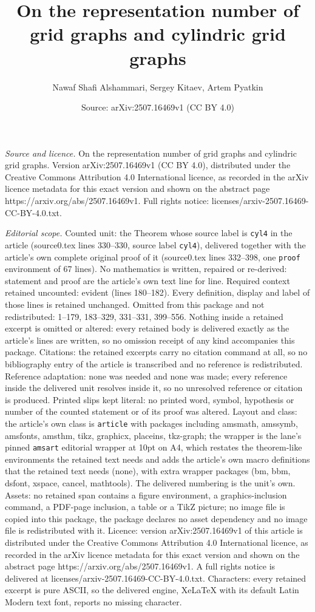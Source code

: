 \documentclass[10pt,a4paper]{amsart}
\title[On the representation number of grid graphs and cylindric gr]{On the representation number of grid graphs and cylindric grid graphs}
\author{Nawaf Shafi Alshammari, Sergey Kitaev, Artem Pyatkin}
\date{Source: arXiv:2507.16469v1 (CC BY 4.0)}
\begin{document}
\maketitle

\noindent\emph{Source and licence.} On the representation number of grid graphs and cylindric grid graphs. Version arXiv:2507.16469v1 (CC BY 4.0), distributed under the Creative Commons Attribution 4.0 International licence, as recorded in the arXiv licence metadata for this exact version and shown on the abstract page https://arxiv.org/abs/2507.16469v1. Full rights notice: licenses/arxiv-2507.16469-CC-BY-4.0.txt.\par\smallskip

\noindent\textit{Editorial scope.} Counted unit: the Theorem whose source label is \texttt{cyl4} in the article (source0.tex lines 330--330, source label \texttt{cyl4}), delivered together with the article's own complete original proof of it (source0.tex lines 332--398, one \texttt{proof} environment of 67 lines). No mathematics is written, repaired or re-derived: statement and proof are the article's own text line for line. Required context retained uncounted: evident (lines 180--182). Every definition, display and label of those lines is retained unchanged. Omitted from this package and not redistributed: 1--179, 183--329, 331--331, 399--556. Nothing inside a retained excerpt is omitted or altered: every retained body is delivered exactly as the article's lines are written, so no omission receipt of any kind accompanies this package. Citations: the retained excerpts carry no citation command at all, so no bibliography entry of the article is transcribed and no reference is redistributed. Reference adaptation: none was needed and none was made; every reference inside the delivered unit resolves inside it, so no unresolved reference or citation is produced. Printed slips kept literal: no printed word, symbol, hypothesis or number of the counted statement or of its proof was altered. Layout and class: the article's own class is \texttt{article} with packages including amsmath, amssymb, amsfonts, amsthm, tikz, graphicx, placeins, tkz-graph; the wrapper is the lane's pinned \texttt{amsart} editorial wrapper at 10pt on A4, which restates the theorem-like environments the retained text needs and adds the article's own macro definitions that the retained text needs (none), with extra wrapper packages (bm, bbm, dsfont, xspace, cancel, mathtools). The delivered numbering is the unit's own. Assets: no retained span contains a figure environment, a graphics-inclusion command, a PDF-page inclusion, a table or a TikZ picture; no image file is copied into this package, the package declares no asset dependency and no image file is redistributed with it. Licence: version arXiv:2507.16469v1 of this article is distributed under the Creative Commons Attribution 4.0 International licence, as recorded in the arXiv licence metadata for this exact version and shown on the abstract page https://arxiv.org/abs/2507.16469v1. A full rights notice is delivered at licenses/arxiv-2507.16469-CC-BY-4.0.txt. Characters: every retained excerpt is pure ASCII, so the delivered engine, XeLaTeX with its default Latin Modern text font, reports no missing character.
\end{document}
